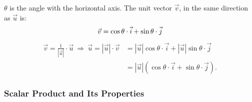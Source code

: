 \documentclass[12pt, a4paper]{article}
\begin{document}
\begin{enumerate}
\begin{figure}[H]
  \end{figure}
  $\theta$ is the angle with the horizontal axis. The unit vector $\vec{v}$, in the same direction as $\vec{u}$ is: 
  $$\vec{v}=\cos\theta\cdot\vec{i}+\sin\theta\cdot\vec{j}\\$$
  $$\begin{aligned}
    \vec{v}=\frac{1}{\left|\vec{u}\right|}\cdot\vec{u}\ \Rightarrow\ \vec{u}=\left|\vec{u}\right|\cdot\vec{v}&=\left|\vec{u}\right|\cos\theta\cdot\vec{i}+\left|\vec{u}\right|\sin\theta\cdot\vec{j}\\
    &=\left|\vec{u}\right|\left(\cos\theta\cdot\vec{i}+\sin\theta\cdot\vec{j}\right).
  \end{aligned}$$
\end{enumerate}

\subsubsection{Scalar Product and Its Properties}
\end{document}
